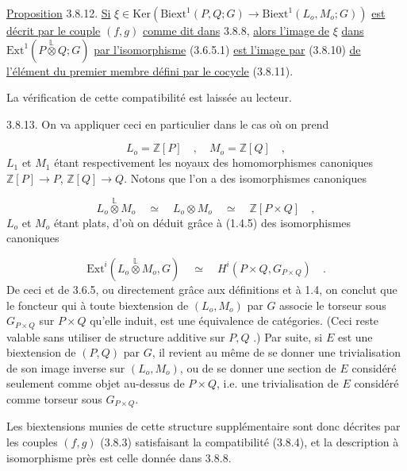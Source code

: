 \underline{Proposition} 3.8.12. \underline{Si} $\xi \in \mathrm{Ker}(\mathrm{Biext}^1(P,Q;G) \longrightarrow \mathrm{Biext}^1(L_o,M_o;G))$ \underline{est} \underline{décrit par le couple} $(f,g)$ \underline{comme dit dans} 3.8.8, \underline{alors l'image de} $\xi$ \underline{dans} $\mathrm{Ext}^1(P \overset{\mathbb{L}}{\otimes} Q;G)$ \underline{par l'isomorphisme} (3.6.5.1) \underline{est l'image par} (3.8.10) \underline{de} \underline{l'élément du premier membre défini par le cocycle} (3.8.11).

La vérification de cette compatibilité est laissée au lecteur.

3.8.13. On va appliquer ceci en particulier dans le cas où on prend

\begin{equation*}
L_o = \mathbb{Z}[P] \quad , \quad M_o = \mathbb{Z}[Q] \quad ,
\end{equation*}
$L_1$ et $M_1$ étant respectivement les noyaux des homomorphismes canoniques $\mathbb{Z}[P] \longrightarrow P$, $\mathbb{Z}[Q] \longrightarrow Q$. Notons que l'on a des isomorphismes canoniques

\begin{equation*}
L_o \overset{\mathbb{L}}{\otimes} M_o \quad \simeq \quad L_o \otimes M_o \quad \simeq \quad \mathbb{Z}[P\times Q] \quad ,
\end{equation*}
$L_o$ et $M_o$ étant plats, d'où on déduit grâce à (1.4.5) des isomorphismes canoniques

\begin{equation*}
\mathrm{Ext}^i(L_o \overset{\mathbb{L}}{\otimes} M_o, G) \quad \simeq \quad H^i(P\times Q, G_{P\times Q}) \quad .
\end{equation*}
De ceci et de 3.6.5, ou directement grâce aux définitions et à 1.4, on conclut que le foncteur qui à toute biextension de $(L_o,M_o)$ par $G$ associe le torseur sous $G_{P\times Q}$ sur $P\times Q$ qu'elle induit, est une équivalence de catégories. (Ceci reste valable sans utiliser de structure additive sur $P,Q$ .) Par suite, si $E$ est une biextension de $(P,Q)$ par $G$, il revient au même de se donner une trivialisation de son image inverse sur $(L_o,M_o)$, ou de se donner une section de $E$ considéré seulement comme objet au-dessus de $P\times Q$, i.e. une trivialisation de $E$ considéré comme torseur sous $G_{P\times Q}$.



Les biextensions munies de cette structure supplémentaire sont donc décrites par les couples $(f,g)$ (3.8.3) satisfaisant la compatibilité (3.8.4), et la description à isomorphisme près est celle donnée dans 3.8.8.

